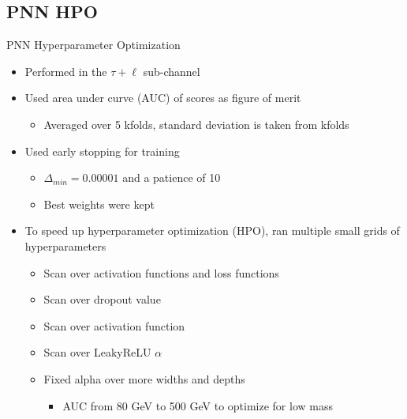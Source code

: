 \documentclass[aspectratio=169,xcolor=table]{beamer}
\begin{document}
  \subsection{ PNN HPO }

    \begin{frame}[t]{PNN Hyperparameter Optimization}
      \begin{itemize}
        \item Performed in the $\tau+\ell$ sub-channel
        \item Used area under curve (AUC) of scores as figure of merit
        \begin{itemize}
          \item Averaged over 5 kfolds, standard deviation is taken from kfolds
        \end{itemize}
          \item Used early stopping for training
          \begin{itemize}
            \item $\Delta_{min}=0.00001$ and a patience of 10
            \item Best weights were kept
          \end{itemize}
        \item To speed up hyperparameter optimization (HPO), ran multiple small grids of hyperparameters
        \begin{itemize}
          \item Scan over activation functions and loss functions
          \item Scan over dropout value
          \item Scan over activation function
          \item Scan over LeakyReLU $\alpha$
          \item Fixed alpha over more widths and depths
          \begin{itemize}
            \item AUC from 80 GeV to 500 GeV to optimize for low mass
          \end{itemize}
        \end{itemize}
      \end{itemize}
    \end{frame}
\end{document}

